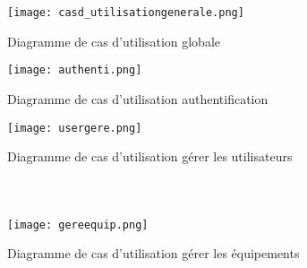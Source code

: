 \begin{figure}

\centering
  \texttt{[image: casd\_utilisationgenerale.png]}\\
  \caption{Diagramme de cas d'utilisation globale}
\end{figure}







\begin{figure}
\centering
  \texttt{[image: authenti.png]}\\
  \caption{Diagramme de cas d'utilisation  authentification }
\end{figure}





\begin{figure}
\centering
  \texttt{[image: usergere.png]}\\
  \caption{Diagramme de cas d'utilisation gérer les utilisateurs }
\end{figure}



\paragraph{\\}

\begin{figure}
\centering
  \texttt{[image: gereequip.png]}\\
  \caption{Diagramme de cas d'utilisation gérer les équipements  }
\end{figure}

\paragraph{\\}
\paragraph{\\}
\paragraph{\\}
